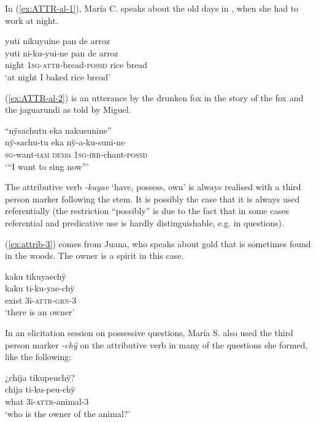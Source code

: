 In (\ref{ex:ATTR-al-1}), María C. speaks about the old days in , when she had to work at night.

\ea\label{ex:ATTR-al-1}
\begingl
\glpreamble yuti nikuyuine pan de arroz\\
\gla yuti ni-ku-yui-ne {pan de arroz}\\
\glb night 1\textsc{sg}-\textsc{attr}-bread-\textsc{possd} {rice bread}\\
\glft ‘at night I baked rice bread’
\endgl
\trailingcitation{[cux-c120510l-1.031]}
\xe

(\ref{ex:ATTR-al-2}) is an utterance by the drunken fox in the story of the fox and the jaguarundi as told by Miguel.

\ea\label{ex:ATTR-al-2}
\begingl
\glpreamble “nÿsachutu eka nakusunine”\\
\gla nÿ-sachu-tu eka nÿ-a-ku-suni-ne\\
\textsc{sg}-want-\textsc{iam} \textsc{dem}a 1\textsc{sg}-\textsc{irr}-chant-\textsc{possd}\\
\glft ‘“I want to sing now”’
\endgl
\trailingcitation{[jmx-n120429ls-x5.380]}
\xe

The attributive verb \textit{-kuyae} ‘have, possess, own’ is always realised with a third person marker following the stem. It is possibly the case that it is always used referentially (the restriction “possibly” is due to the fact that in some cases referential and predicative use is hardly distinguishable, e.g. in questions).

(\ref{ex:attrib-3}) comes from Juana, who speaks about gold that is sometimes found in the woods. The owner is a spirit in this case.

\ea\label{ex:attrib-3}
\begingl
\glpreamble kaku tikuyaechÿ\\
\gla kaku ti-ku-yae-chÿ\\
\glb exist 3i-\textsc{attr}-\textsc{grn}-3\\
\glft ‘there is an owner’
\endgl
\trailingcitation{[jxx-p151020l-2]}
\xe

In an elicitation session on possessive questions, María S. also used the third person marker \textit{-chÿ} on the attributive verb in many of the questions she formed, like the following:

\ea\label{ex:attrib-4}
\begingl
\glpreamble ¿chija tikupeuchÿ?\\
\gla chija ti-ku-peu-chÿ\\
\glb what 3i-\textsc{attr}-animal-3\\
\glft ‘who is the owner of the animal?’
\endgl
\trailingcitation{[rxx-e201231f.02]}
\xe

